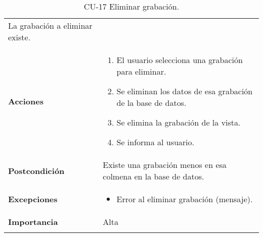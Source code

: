 \begin{longtable}[H]{@{}ll@{}}
\begin{minipage}[t]{0.66\columnwidth}
La grabación a eliminar existe.\strut
\end{minipage}\tabularnewline
\begin{minipage}[t]{0.28\columnwidth}\raggedright\strut
\textbf{Acciones}\strut
\end{minipage} & \begin{minipage}[t]{0.66\columnwidth}\raggedright\strut
\begin{enumerate}
\def\labelenumi{\arabic{enumi}.}
\tightlist
\item
  El usuario selecciona una grabación para eliminar.
\item
  Se eliminan los datos de esa grabación de la base de datos.
\item
  Se elimina la grabación de la vista.
\item
  Se informa al usuario.
\end{enumerate}\strut
\end{minipage}\tabularnewline
\begin{minipage}[t]{0.28\columnwidth}\raggedright\strut
\textbf{Postcondición}\strut
\end{minipage} & \begin{minipage}[t]{0.66\columnwidth}\raggedright\strut
Existe una grabación menos en esa colmena en la base de datos.\strut
\end{minipage}\tabularnewline
\begin{minipage}[t]{0.28\columnwidth}\raggedright\strut
\textbf{Excepciones}\strut
\end{minipage} & \begin{minipage}[t]{0.66\columnwidth}\raggedright\strut
\begin{itemize}
\tightlist
\item
  Error al eliminar grabación (mensaje).
\end{itemize}\strut
\end{minipage}\tabularnewline
\begin{minipage}[t]{0.28\columnwidth}\raggedright\strut
\textbf{Importancia}\strut
\end{minipage} & \begin{minipage}[t]{0.66\columnwidth}\raggedright\strut
Alta\strut
\end{minipage}\tabularnewline
\bottomrule
\caption{CU-17 Eliminar grabación.}
\end{longtable}

